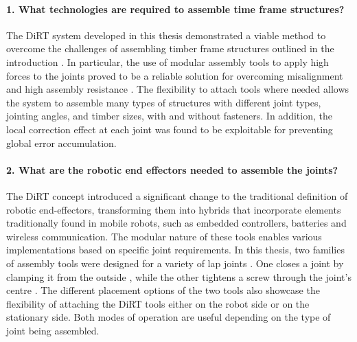 	\paragraph{1. What technologies are required to assemble time frame structures?}

The DiRT system developed in this thesis demonstrated a viable method to overcome the challenges of assembling timber frame structures outlined in the introduction . In particular, the use of modular assembly tools to apply high forces to the joints proved to be a reliable solution for overcoming misalignment  and high assembly resistance . The flexibility to attach tools where needed allows the system to assemble many types of structures with different joint types, jointing angles, and timber sizes, with and without fasteners. In addition, the local correction effect at each joint was found to be exploitable for preventing global error accumulation.

\paragraph{2. What are the robotic end effectors needed to assemble the joints?}

The DiRT concept introduced a significant change to the traditional definition of robotic end-effectors, transforming them into hybrids that incorporate elements traditionally found in mobile robots, such as embedded controllers, batteries and wireless communication. The modular nature of these tools enables various implementations based on specific joint requirements. In this thesis, two families of assembly tools were designed for a variety of lap joints . One closes a joint by clamping it from the outside , while the other tightens a screw through the joint's centre . The different placement options of the two tools also showcase the flexibility of attaching the DiRT tools either on the robot side or on the stationary side. Both modes of operation are useful depending on the type of joint being assembled.

